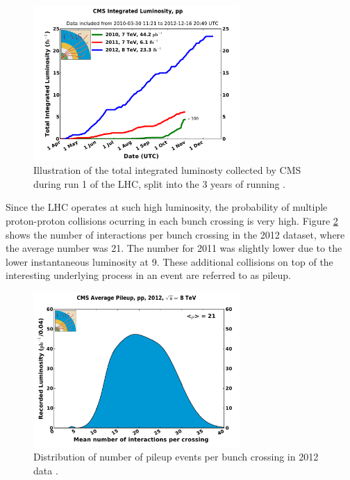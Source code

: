 \begin{figure}[htbp]
   \includegraphics[width=0.7\textwidth]{plots/detector/int_lumi_cumulative_pp_2.pdf}
\caption[Illustration of the total integrated luminosty collected by CMS during run 1 of the
LHC.]{Illustration of the total integrated luminosty collected by CMS during run 1 of the
LHC, split into the 3 years of running \cite{cmslumitwiki}.}
\label{fig:detlumi}
\end{figure}

Since the LHC operates at such high luminosity, the probability of multiple
proton-proton collisions ocurring in each bunch crossing is very high. Figure 
\ref{fig:PU} shows the number of interactions per bunch crossing in the
2012 dataset, where the average number was 21. The number for 2011 was slightly
lower due to the lower instantaneous luminosity at 9. 
These additional collisions on top of the interesting
underlying process in an event are referred to as pileup.

\begin{figure}[htbp]
   \includegraphics[width=0.7\textwidth]{plots/detector/pileup_pp_2012-2.pdf}
\caption[Distribution of number of pileup events per bunch crossing in 2012
data.]{Distribution of number of pileup events per bunch crossing in 2012 data \cite{cmslumitwiki}.}
\label{fig:PU}
\end{figure}

